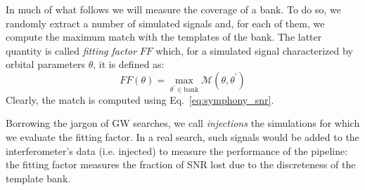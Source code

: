 \documentclass[twocolumn,showpacs,preprintnumbers,nofootinbib,prd,
superscriptaddress,10pt]{revtex4-2}
\begin{document}
In much of what follows we will measure the coverage of a bank. To do so, we randomly extract a number of simulated signals and, for each of them, we compute the maximum match with the templates of the bank. The latter quantity is called {\it fitting factor} $FF$ which, for a simulated signal characterized by orbital parameters $\theta$, it is defined as:
%
\begin{equation}\label{eq:FF}
	FF(\theta) = \max_{\theta^\prime \in \text{bank}} \mathcal{M}(\theta, \theta^\prime)
\end{equation}
%
Clearly, the match is computed using Eq.~\eqref{eq:symphony_snr}.

Borrowing the jargon of GW searches, we call {\it injections} the simulations for which we evaluate the fitting factor. In a real search, such signals would be added to the interferometer's data (i.e. injected) to measure the performance of the pipeline: the fitting factor measures the fraction of SNR lost due to the discreteness of the template bank.

\end{document}
